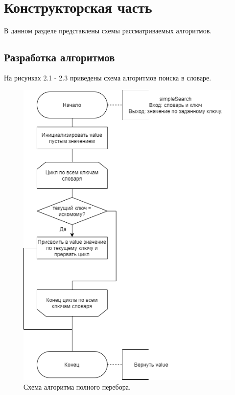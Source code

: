 \documentclass[12pt]{report}
\begin{document}
\chapter{Конструкторская часть}

В данном разделе представлены схемы рассматриваемых алгоритмов.

\section{Разработка алгоритмов}

На рисунках 2.1 - 2.3 приведены схема алгоритмов поиска в словаре.

\begin{figure}[H]
	\centering
	\includegraphics[scale=0.625]{simple_search.drawio.png}
	\caption{Схема алгоритма полного перебора.}
	\label{fig:mpr}
\end{figure}
\end{document}
